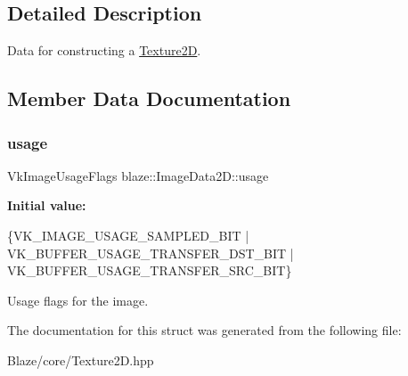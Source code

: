 \subsection{Detailed Description}
Data for constructing a \hyperlink{classblaze_1_1Texture2D}{Texture2D}. 

\subsection{Member Data Documentation}
\mbox{\label{structblaze_1_1ImageData2D_ad6199a1532afd652fd5304805b820715}} 
\subsubsection{\texorpdfstring{usage}{usage}}
{\footnotesize\ttfamily Vk\+Image\+Usage\+Flags blaze\+::\+Image\+Data2\+D\+::usage}

{\bfseries Initial value\+:}
\begin{DoxyCode}
\{VK\_IMAGE\_USAGE\_SAMPLED\_BIT | VK\_BUFFER\_USAGE\_TRANSFER\_DST\_BIT |
                            VK\_BUFFER\_USAGE\_TRANSFER\_SRC\_BIT\}
\end{DoxyCode}


Usage flags for the image. 



The documentation for this struct was generated from the following file\+:\begin{DoxyCompactItemize}
\item 
Blaze/core/Texture2\+D.\+hpp\end{DoxyCompactItemize}
